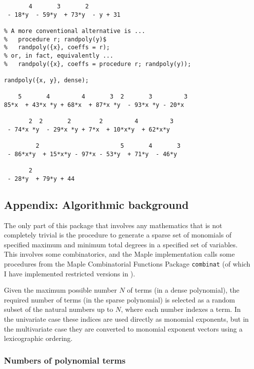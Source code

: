 \begin{verbatim}
       4       3       2         
 - 18*y  - 59*y  + 73*y  - y + 31

% A more conventional alternative is ...
%   procedure r; randpoly(y)$
%   randpoly({x}, coeffs = r);
% or, in fact, equivalently ...
%   randpoly({x}, coeffs = procedure r; randpoly(y));

randpoly({x, y}, dense);

    5       4         4       3  2       3         3
85*x  + 43*x *y + 68*x  + 87*x *y  - 93*x *y - 20*x

       2  2       2        2         4         3
 - 74*x *y  - 29*x *y + 7*x  + 10*x*y  + 62*x*y 

         2                       5       4       3
 - 86*x*y  + 15*x*y - 97*x - 53*y  + 71*y  - 46*y 

       2            
 - 28*y  + 79*y + 44
\end{verbatim}




\newtheorem{prop}{Proposition}

\newenvironment{randpproof}%
   {\par\addvspace\baselineskip\noindent\textbf{Proof~}}%
   {\hspace*{\fill}$\Box$\par\addvspace\baselineskip}

\subsection{Appendix: Algorithmic background}

The only part of this package that involves any mathematics that is
not completely trivial is the procedure to generate a sparse set of
monomials of specified maximum and minimum total degrees in a
specified set of variables.  This involves some combinatorics, and the
Maple implementation calls some procedures from the Maple
Combinatorial Functions Package \texttt{combinat} (of which I have
implemented restricted versions in \REDUCE).

Given the maximum possible number $N$ of terms (in a dense
polynomial), the required number of terms (in the sparse polynomial)
is selected as a random subset of the natural numbers up to $N$, where
each number indexes a term.  In the univariate case these indices are
used directly as monomial exponents, but in the multivariate case they
are converted to monomial exponent vectors using a lexicographic
ordering.


\subsubsection{Numbers of polynomial terms}

